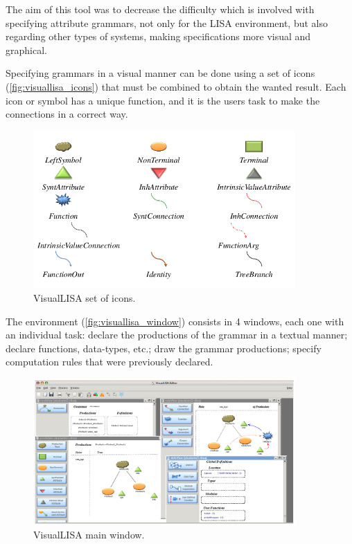 The aim of this tool was to decrease the difficulty which is involved with specifying attribute grammars, not only for the LISA environment, but also regarding other types of systems, 
making specifications more visual and graphical.
    
Specifying grammars in a visual manner can be done using a set of icons (\autoref{fig:visuallisa_icons}) that must be combined to obtain the wanted result. 
Each icon or symbol has a unique function, and it is the users task to make the connections in a correct way.
    
\begin{figure}[h]
    \centering
    \includegraphics[width=10cm]{images/visuallisa_icons.png}
    \caption{VisualLISA set of icons.}
    \label{fig:visuallisa_icons}
\end{figure}

\newpage
The environment (\autoref{fig:visuallisa_window}) consists in 4 windows, each one with an individual task: 
declare the productions of the grammar in a textual manner; 
declare functions, data-types, etc.; 
draw the grammar productions; 
specify computation rules that were previously declared.
    
\begin{figure}[h]
    \centering
    \includegraphics[width=10cm]{images/visuallisa_window.png}
    \caption{VisualLISA main window.}
    \label{fig:visuallisa_window}
\end{figure}
    
